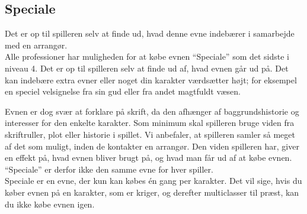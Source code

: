 \subsection*{Speciale}

Det er op til spilleren selv at finde ud, hvad denne evne indebærer i samarbejde med en arrangør.\\

Alle professioner har muligheden for at købe evnen “Speciale” som det sidste i niveau 4. Det er op til spilleren selv at finde ud af, hvad evnen går ud på. Det kan indebære extra evner eller noget din karakter værdsætter højt; for eksempel en speciel velsignelse fra sin gud eller fra andet magtfuldt væsen.

Evnen er dog svær at forklare på skrift, da den afhænger af baggrundshistorie og interesser for den enkelte karakter. Som minimum skal spilleren bruge viden fra skriftruller, plot eller historie i spillet. Vi anbefaler, at spilleren samler så meget af det som muligt, inden de kontakter en arrangør. Den viden spilleren har, giver en effekt på, hvad evnen bliver brugt på, og hvad man får ud af at købe evnen. “Speciale” er derfor ikke den samme evne for hver spiller.\\

Speciale er en evne, der kun kan købes én gang per karakter. Det vil sige, hvis du køber evnen på en karakter, som er kriger, og derefter multiclasser til præst, kan du ikke købe evnen igen.
